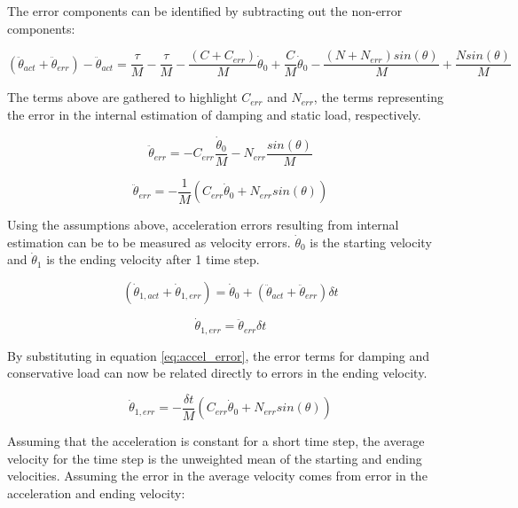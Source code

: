 The error components can be identified by subtracting out the non-error 
components:

\begin{equation}
(\ddot{\theta}_{act} + \ddot{\theta}_{err}) - \ddot{\theta}_{act} =
\dfrac{\tau}{M} - \dfrac{\tau}{M}
- \dfrac{(C + C_{err})}{M}\dot{\theta}_{0} + \dfrac{C}{M}\dot{\theta}_{0}
- \dfrac{(N + N_{err})sin(\theta)}{M}  + \dfrac{N sin(\theta)}{M}
\end{equation}

The terms above are gathered to highlight $C_{err}$ and $N_{err}$, the terms representing the error in the internal estimation of damping and static load, respectively.

\begin{equation}
\ddot{\theta}_{err} =
- C_{err} \dfrac{\dot{\theta}_{0}}{M}
- N_{err} \dfrac{sin(\theta)}{M}
\end{equation}

\begin{equation} \label{eq:accel_error}
\ddot{\theta}_{err} = - \dfrac{1}{M}
(C_{err} \dot{\theta}_{0} + N_{err} sin(\theta))
\end{equation}


Using the assumptions above, acceleration errors resulting from internal estimation can be to be measured as velocity errors. $\dot{\theta}_{0}$ is the starting velocity and $\dot{\theta}_{1}$ is the ending velocity after 1 time step.

\begin{equation}
(\dot{\theta}_{1, act} + \dot{\theta}_{1, err}) = \dot{\theta}_{0} + (\ddot{\theta}_{act} + \ddot{\theta}_{err}) \delta t
\end{equation}

\begin{equation}
\dot{\theta}_{1, err} = \ddot{\theta}_{err} \delta t
\end{equation}

By substituting in equation \ref{eq:accel_error}, the error terms for damping and conservative load can now be related directly to errors in the ending velocity.

\begin{equation} \label{eq:end_vel}
\dot{\theta}_{1, err} = - \dfrac{\delta t}{M}(C_{err} \dot{\theta}_{0} + N_{err} sin(\theta))
\end{equation}

Assuming that the acceleration is constant for a short time step, the average velocity for the time step is the unweighted mean of the starting and ending velocities. Assuming the error in the average velocity comes from error in the acceleration and ending velocity:

